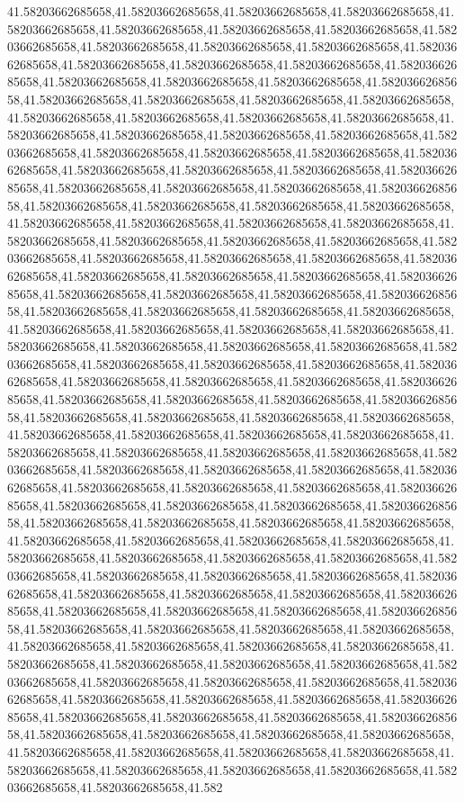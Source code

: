 41.58203662685658,41.58203662685658,41.58203662685658,41.58203662685658,41.58203662685658,41.58203662685658,41.58203662685658,41.58203662685658,41.58203662685658,41.58203662685658,41.58203662685658,41.58203662685658,41.58203662685658,41.58203662685658,41.58203662685658,41.58203662685658,41.58203662685658,41.58203662685658,41.58203662685658,41.58203662685658,41.58203662685658,41.58203662685658,41.58203662685658,41.58203662685658,41.58203662685658,41.58203662685658,41.58203662685658,41.58203662685658,41.58203662685658,41.58203662685658,41.58203662685658,41.58203662685658,41.58203662685658,41.58203662685658,41.58203662685658,41.58203662685658,41.58203662685658,41.58203662685658,41.58203662685658,41.58203662685658,41.58203662685658,41.58203662685658,41.58203662685658,41.58203662685658,41.58203662685658,41.58203662685658,41.58203662685658,41.58203662685658,41.58203662685658,41.58203662685658,41.58203662685658,41.58203662685658,41.58203662685658,41.58203662685658,41.58203662685658,41.58203662685658,41.58203662685658,41.58203662685658,41.58203662685658,41.58203662685658,41.58203662685658,41.58203662685658,41.58203662685658,41.58203662685658,41.58203662685658,41.58203662685658,41.58203662685658,41.58203662685658,41.58203662685658,41.58203662685658,41.58203662685658,41.58203662685658,41.58203662685658,41.58203662685658,41.58203662685658,41.58203662685658,41.58203662685658,41.58203662685658,41.58203662685658,41.58203662685658,41.58203662685658,41.58203662685658,41.58203662685658,41.58203662685658,41.58203662685658,41.58203662685658,41.58203662685658,41.58203662685658,41.58203662685658,41.58203662685658,41.58203662685658,41.58203662685658,41.58203662685658,41.58203662685658,41.58203662685658,41.58203662685658,41.58203662685658,41.58203662685658,41.58203662685658,41.58203662685658,41.58203662685658,41.58203662685658,41.58203662685658,41.58203662685658,41.58203662685658,41.58203662685658,41.58203662685658,41.58203662685658,41.58203662685658,41.58203662685658,41.58203662685658,41.58203662685658,41.58203662685658,41.58203662685658,41.58203662685658,41.58203662685658,41.58203662685658,41.58203662685658,41.58203662685658,41.58203662685658,41.58203662685658,41.58203662685658,41.58203662685658,41.58203662685658,41.58203662685658,41.58203662685658,41.58203662685658,41.58203662685658,41.58203662685658,41.58203662685658,41.58203662685658,41.58203662685658,41.58203662685658,41.58203662685658,41.58203662685658,41.58203662685658,41.58203662685658,41.58203662685658,41.58203662685658,41.58203662685658,41.58203662685658,41.58203662685658,41.58203662685658,41.58203662685658,41.58203662685658,41.58203662685658,41.58203662685658,41.58203662685658,41.58203662685658,41.58203662685658,41.58203662685658,41.58203662685658,41.58203662685658,41.58203662685658,41.58203662685658,41.58203662685658,41.58203662685658,41.58203662685658,41.58203662685658,41.58203662685658,41.58203662685658,41.58203662685658,41.58203662685658,41.58203662685658,41.58203662685658,41.58203662685658,41.58203662685658,41.58203662685658,41.58203662685658,41.58203662685658,41.58203662685658,41.58203662685658,41.58203662685658,41.58203662685658,41.58203662685658,41.58203662685658,41.58203662685658,41.58203662685658,41.58203662685658,41.58203662685658,41.58203662685658,41.58203662685658,41.58203662685658,41.58203662685658,41.58203662685658,41.582